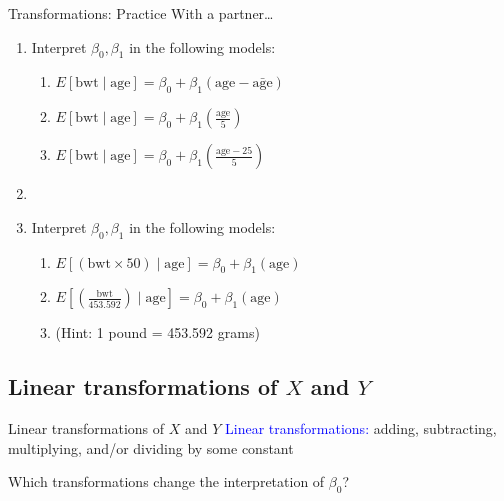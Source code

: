 \documentclass[10pt,t]{beamer}
\begin{document}
\begin{frame}{Transformations: Practice}
With a partner\dots

\vspace{0.3cm}

\begin{enumerate}
	\item Interpret $\beta_0, \beta_1$ in the following models:
	\begin{enumerate}
		\item $E[\text{bwt} \mid \text{age}] = \beta_0 + \beta_1 (\text{age} - \bar{\text{age}})$
		\item $E[\text{bwt} \mid \text{age}] = \beta_0 + \beta_1 \left( \frac{\text{age}}{5} \right)$
		\item $E[\text{bwt} \mid \text{age}] = \beta_0 + \beta_1 \left( \frac{\text{age} - 25}{5} \right)$
	\end{enumerate}
\item[]
	\item Interpret $\beta_0, \beta_1$ in the following models:
	\begin{enumerate}
		\item $E[(\text{bwt} \times 50) \mid \text{age}] = \beta_0 + \beta_1 (\text{age})$
		\item $E[(\frac{\text{bwt}}{453.592}) \mid \text{age}] = \beta_0 + \beta_1 (\text{age})$
		\item[] \tiny (Hint: 1 pound = 453.592 grams)
	\end{enumerate}
\end{enumerate}


\end{frame}

\subsection{Linear transformations of $X$ and $Y$}

\begin{frame}{Linear transformations of $X$ and $Y$}
\textcolor{blue}{Linear transformations:} adding, subtracting, multiplying, and/or dividing by some constant

\vspace{0.3cm}

Which transformations change the interpretation of $\beta_0$?

\end{frame}
\end{document}
